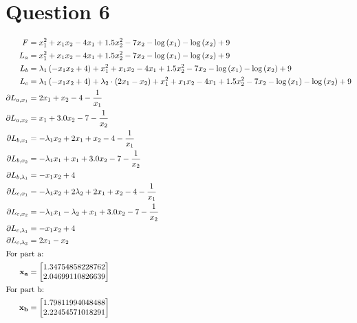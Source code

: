 \documentclass[a4paper,12pt]{article} %
\begin{document}
\section*{\textbf{Question 6}}
\begin{align*}
    F &= x_{1}^{2} + x_{1} x_{2} - 4 x_{1} + 1.5 x_{2}^{2} - 7 x_{2} - \log{\left(x_{1} \right)} - \log{\left(x_{2} \right)} + 9 \\
    L_a &= x_{1}^{2} + x_{1} x_{2} - 4 x_{1} + 1.5 x_{2}^{2} - 7 x_{2} - \log{\left(x_{1} \right)} - \log{\left(x_{2} \right)} + 9\\
    L_b &= \lambda_{1} \left(- x_{1} x_{2} + 4\right) + x_{1}^{2} + x_{1} x_{2} - 4 x_{1} + 1.5 x_{2}^{2} - 7 x_{2} - \log{\left(x_{1} \right)} - \log{\left(x_{2} \right)} + 9\\
    L_c &= \lambda_{1} \left(- x_{1} x_{2} + 4\right) + \lambda_{2} \cdot \left(2 x_{1} - x_{2}\right) + x_{1}^{2} + x_{1} x_{2} - 4 x_{1} + 1.5 x_{2}^{2} - 7 x_{2} - \log{\left(x_{1} \right)} - \log{\left(x_{2} \right)} + 9\\
    \partial L_{a,x_1} &= 2 x_{1} + x_{2} - 4 - \frac{1}{x_{1}}\\
    \partial L_{a,x_2} &= x_{1} + 3.0 x_{2} - 7 - \frac{1}{x_{2}}\\
    \partial L_{b,x_1} &= - \lambda_{1} x_{2} + 2 x_{1} + x_{2} - 4 - \frac{1}{x_{1}}\\
    \partial L_{b,x_2} &= - \lambda_{1} x_{1} + x_{1} + 3.0 x_{2} - 7 - \frac{1}{x_{2}}\\
    \partial L_{b,\lambda_1} &= - x_{1} x_{2} + 4\\
    \partial L_{c,x_1} &= - \lambda_{1} x_{2} + 2 \lambda_{2} + 2 x_{1} + x_{2} - 4 - \frac{1}{x_{1}}\\
    \partial L_{c,x_2} &= - \lambda_{1} x_{1} - \lambda_{2} + x_{1} + 3.0 x_{2} - 7 - \frac{1}{x_{2}}\\
    \partial L_{c,\lambda_1} &= - x_{1} x_{2} + 4\\
    \partial L_{c,\lambda_2} &= 2 x_{1} - x_{2}\\
    \intertext{For part a:}
    \vect{x_a} &= \left[\begin{matrix}1.34754858228762\\2.04699110826639\end{matrix}\right] \\
    \intertext{For part b:}
    \vect{x_b} &= \left[\begin{matrix}1.79811994048488\\2.22454571018291\end{matrix}\right] \\

\end{align*}
\end{document}
